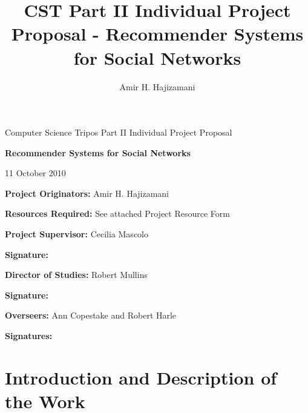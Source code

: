 
\author{Amir H. Hajizamani}
\title{CST Part II Individual Project Proposal - Recommender Systems for Social Networks}

\newcommand{\al}{$<$}
\newcommand{\ar}{$>$}

\parindent 0pt
\parskip 6pt

\thispagestyle{empty}

\medskip
{}
\medskip
{}

\vfill

\centerline{\large Computer Science Tripos Part II Individual Project Proposal}
\vspace{0.4in}
\centerline{\Large\bf Recommender Systems for Social Networks}
\vspace{0.3in}
\centerline{\large{11 October 2010}}

\vfill

{\bf Project Originators:} Amir H. Hajizamani

\vspace{0.1in}

{\bf Resources Required:} See attached Project Resource Form

\vspace{0.5in}

{\bf Project Supervisor:} Cecilia Mascolo

\vspace{0.2in}

{\bf Signature:}

\vspace{0.5in}

{\bf Director of Studies:} Robert Mullins

\vspace{0.2in}

{\bf Signature:}

\vspace{0.5in}

{\bf Overseers:} Ann Copestake and Robert Harle

\vspace{0.2in}

{\bf Signatures:}

\vfill
\eject


\section{Introduction and Description of the Work}

